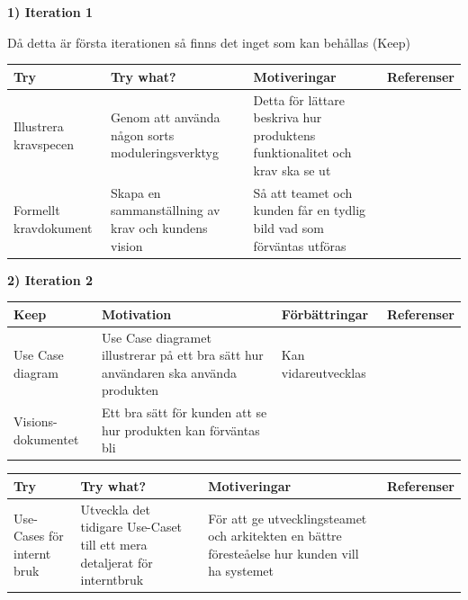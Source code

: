 \documentclass[conference,a4paper]{IEEEtran}
\newcommand\Tstrut{\rule{0pt}{2.6ex}}       %
\newcommand\Bstrut{\rule[-0.9ex]{0pt}{0pt}} %
\newcommand{\TBstrut}{\Tstrut\Bstrut} %
\begin{document}
\textbf{1) Iteration 1}

Då detta är första iterationen så finns det inget som kan behållas (Keep)

\begin{table}[H]
	\small
  \centering
	\begin{tabular}{|p{1.5cm}|p{2cm}|p{1.8cm}|p{1.5cm}|} %
    \hline
    Try & Try what? & Motiveringar & Referenser \TBstrut \\
    \hline
     Illustrera kravspecen & Genom att använda någon sorts moduleringsverktyg & Detta för lättare beskriva hur produktens funktionalitet och krav ska se ut  & \TBstrut \\
    \hline
     Formellt kravdokument & Skapa en sammanställning av krav och kundens vision & Så att teamet och kunden får en tydlig bild vad som förväntas utföras  & \TBstrut \\
    \hline 
  \end{tabular}
\end{table}

\textbf{2) Iteration 2}

\begin{table}[H]
	\small
  \centering
	\begin{tabular}{|p{1.5cm}|p{2cm}|p{1.8cm}|p{1.5cm}|} %
    \hline
    Keep & Motivation & Förbättringar & Referenser \TBstrut \\
    \hline
   Use Case diagram & Use Case diagramet illustrerar på ett bra sätt hur användaren ska använda produkten & Kan vidareutvecklas & \cite{Jacobson11} \TBstrut \\
    \hline
    Visions-dokumentet & Ett bra sätt för kunden att se hur produkten kan förväntas bli &  & \cite{Sommerville10} \TBstrut \\
    \hline
  \end{tabular}
\end{table}

\begin{table}[H]
	\small
  \centering
	\begin{tabular}{|p{1.5cm}|p{2cm}|p{1.8cm}|p{1.5cm}|} %
    \hline
    Try & Try what? & Motiveringar & Referenser \TBstrut \\
    \hline
    Use-Cases för internt bruk & Utveckla det tidigare Use-Caset till ett mera detaljerat för interntbruk & För att ge utvecklingsteamet och arkitekten en bättre föresteåelse hur kunden vill ha systemet & \TBstrut \\
    \hline
  \end{tabular}
\end{table}
\end{document}
